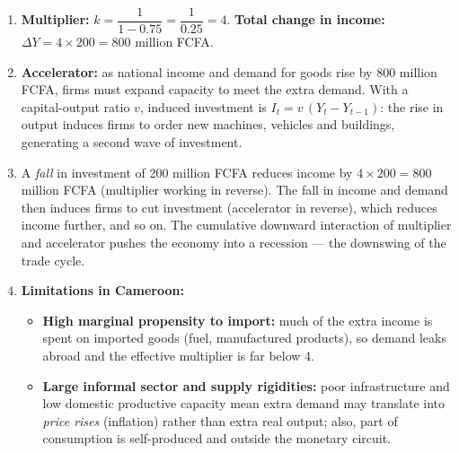 \documentclass[11pt]{article}
\begin{document}
\begin{corrige}
\begin{enumerate}
\item \textbf{Multiplier:} $k = \dfrac{1}{1 - 0.75} = \dfrac{1}{0.25} = 4$. \textbf{Total change in income:} $\Delta Y = 4 \times 200 = 800$ million FCFA.
\item \textbf{Accelerator:} as national income and demand for goods rise by 800 million FCFA, firms must expand capacity to meet the extra demand. With a capital-output ratio $v$, induced investment is $I_t = v\,(Y_t - Y_{t-1})$: the rise in output induces firms to order new machines, vehicles and buildings, generating a second wave of investment.
\item A \emph{fall} in investment of 200 million FCFA reduces income by $4 \times 200 = 800$ million FCFA (multiplier working in reverse). The fall in income and demand then induces firms to cut investment (accelerator in reverse), which reduces income further, and so on. The cumulative downward interaction of multiplier and accelerator pushes the economy into a recession — the downswing of the trade cycle.
\item \textbf{Limitations in Cameroon:}
\begin{itemize}
\item \textbf{High marginal propensity to import:} much of the extra income is spent on imported goods (fuel, manufactured products), so demand leaks abroad and the effective multiplier is far below 4.
\item \textbf{Large informal sector and supply rigidities:} poor infrastructure and low domestic productive capacity mean extra demand may translate into \emph{price rises} (inflation) rather than extra real output; also, part of consumption is self-produced and outside the monetary circuit.
\end{itemize}
\end{enumerate}
\end{corrige}
\end{document}
